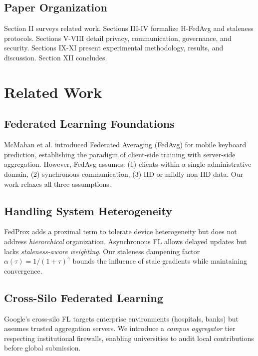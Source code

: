 \documentclass[conference]{IEEEtran}
\begin{document}
\subsection{Paper Organization}

Section II surveys related work. Sections III-IV formalize H-FedAvg and staleness protocols. Sections V-VIII  detail privacy, communication, governance, and security. Sections IX-XI present experimental methodology, results, and discussion. Section XII concludes.

\section{Related Work}

\subsection{Federated Learning Foundations}

McMahan et al. \cite{mcmahan2017} introduced Federated Averaging (FedAvg) for mobile keyboard prediction, establishing the paradigm of client-side training with server-side aggregation. However, FedAvg assumes: (1) clients within a single administrative domain, (2) synchronous communication, (3) IID or mildly non-IID data. Our work relaxes all three assumptions.

\subsection{Handling System Heterogeneity}

FedProx \cite{li2020fedprox} adds a proximal term to tolerate device heterogeneity but does not address \textit{hierarchical} organization. Asynchronous FL \cite{xie2019asynchronous} allows delayed updates but lacks \textit{staleness-aware weighting}. Our staleness dampening factor $\alpha(\tau) = 1/(1+\tau)^\gamma$ bounds the influence of stale gradients while maintaining convergence.

\subsection{Cross-Silo Federated Learning}

Google's cross-silo FL \cite{kairouz2021advances} targets enterprise environments (hospitals, banks) but assumes trusted aggregation servers. We introduce a \textit{campus aggregator} tier respecting institutional firewalls, enabling universities to audit local contributions before global submission.
\end{document}
